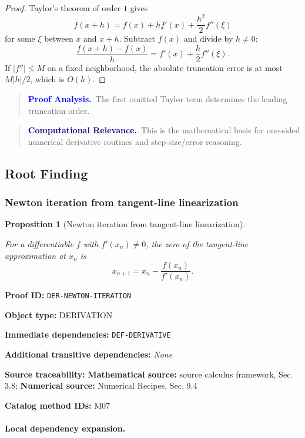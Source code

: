 \documentclass[10pt]{article}
\newcommand{\pidraw}[1]{\begingroup\urlstyle{tt}\nolinkurl{#1}\endgroup}
\newtheorem{proposition}[theorem]{Proposition}
\theoremstyle{definition}
\theoremstyle{remark}
\newenvironment{proofanalysis}
{\begin{quote}\small\noindent\textbf{\textcolor{blue}{Proof Analysis.}}\ }
{\end{quote}}
\newenvironment{computationalrelevance}
{\begin{quote}\small\noindent\textbf{\textcolor{navy}{Computational Relevance.}}\ }
{\end{quote}}
\newcommand{\meta}[2]{\noindent\textbf{#1:} #2\par}
\begin{document}
\begin{proof}

Taylor's theorem of order $1$ gives
\[
f(x+h)=f(x)+hf'(x)+\frac{h^2}{2}f''(\xi)
\]
for some $\xi$ between $x$ and $x+h$. Subtract $f(x)$ and divide by $h\ne0$:
\[
\frac{f(x+h)-f(x)}{h}
=
f'(x)+\frac{h}{2}f''(\xi).
\]
If $|f''|\le M$ on a fixed neighborhood, the absolute truncation error is at most
$M|h|/2$, which is $O(h)$.

\end{proof}

\begin{proofanalysis}The first omitted Taylor term determines the leading truncation order.\end{proofanalysis}

\begin{computationalrelevance}This is the mathematical basis for one-sided numerical derivative routines and step-size/error reasoning.\end{computationalrelevance}

\subsection{Root Finding}

\subsubsection{Newton iteration from tangent-line linearization}

\begin{proposition}[Newton iteration from tangent-line linearization]\label{prf:DER-NEWTON-ITERATION}

For a differentiable $f$ with $f'(x_n)\ne0$, the zero of the tangent-line approximation at $x_n$ is
\[
x_{n+1}=x_n-\frac{f(x_n)}{f'(x_n)}.
\]

\end{proposition}

\meta{Proof ID}{\pidraw{DER-NEWTON-ITERATION}}
\meta{Object type}{DERIVATION}
\meta{Immediate dependencies}{\pidraw{DEF-DERIVATIVE}}
\meta{Additional transitive dependencies}{\emph{None}}
\meta{Source traceability}{\textbf{Mathematical source:} source calculus framework, Sec. 3.8; \textbf{Numerical source:} Numerical Recipes, Sec. 9.4}
\meta{Catalog method IDs}{M07}

\paragraph{Local dependency expansion.}
\end{document}
